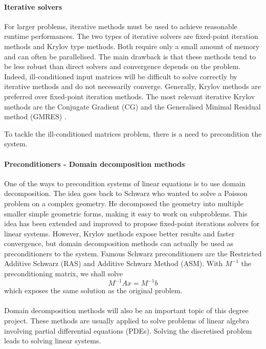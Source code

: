 \paragraph{Iterative solvers}
For larger problems, iterative methods must be used to achieve reasonable runtime performances.
The two types of iterative solvers are fixed-point iteration methods and Krylov type methods.
Both require only a small amount of memory and can often be parallelised.
The main drawback is that these methods tend to be less robust than direct solvers and convergence depends on the problem.
Indeed, ill-conditioned input matrices will be difficult to solve correctly by iterative methods and do not necessarily converge.
Generally, Krylov methods are preferred over fixed-point iteration methods.
The most relevant iterative Krylov methods are the Conjugate Gradient (CG) and the Generalised Minimal Residual method (GMRES) \cite{saad_iterative_2003} \cite{saad_gmres_1986}.

To tackle the ill-conditioned matrices problem, there is a need to precondition the system.


\paragraph{Preconditioners - Domain decomposition methods}
One of the ways to precondition systems of linear equations is to use domain decomposition.
The idea goes back to Schwarz who wanted to solve a Poisson problem on a complex geometry.
He decomposed the geometry into multiple smaller simple geometric forms, making it easy to work on subproblems.
This idea has been extended and improved to propose fixed-point iterations solvers for linear systems.
However, Krylov methods expose better results and faster convergence, but domain decomposition methods can actually be used as preconditioners to the system.
Famous Schwarz preconditioners are the Restricted Additive Schwarz (RAS) and Additive Schwarz Method (ASM).
With \(M^{-1}\) the preconditioning matrix, we shall solve
\[M^{-1}Ax = M^{-1}b\]
which exposes the same solution as the original problem.

\paragraph{}
Domain decomposition methods will also be an important topic of this degree project.
These methods are usually applied to solve problems of linear algebra involving partial differential equations (PDEs).
Solving the discretised problem leads to solving linear systems.

